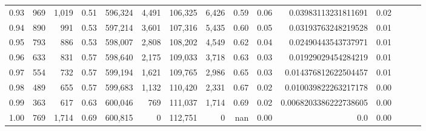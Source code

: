 \begin{tabular}{rrrrrrrrrrrrrrr}
0.93 &     969 &  1,019 &  0.51 &  596,324 &    4,491 &  106,325 &    6,426 &  0.59 &  0.06 &    0.03983113231811691 &      0.02 \\
0.94 &     890 &    991 &  0.53 &  597,214 &    3,601 &  107,316 &    5,435 &  0.60 &  0.05 &    0.03193763248219528 &      0.01 \\
0.95 &     793 &    886 &  0.53 &  598,007 &    2,808 &  108,202 &    4,549 &  0.62 &  0.04 &    0.02490443543737971 &      0.01 \\
0.96 &     633 &    831 &  0.57 &  598,640 &    2,175 &  109,033 &    3,718 &  0.63 &  0.03 &    0.01929029454284219 &      0.01 \\
0.97 &     554 &    732 &  0.57 &  599,194 &    1,621 &  109,765 &    2,986 &  0.65 &  0.03 &   0.014376812622504457 &      0.01 \\
0.98 &     489 &    655 &  0.57 &  599,683 &    1,132 &  110,420 &    2,331 &  0.67 &  0.02 &   0.010039822263217178 &      0.00 \\
0.99 &     363 &    617 &  0.63 &  600,046 &      769 &  111,037 &    1,714 &  0.69 &  0.02 &  0.0068203386222738605 &      0.00 \\
1.00 &     769 &  1,714 &  0.69 &  600,815 &        0 &  112,751 &        0 &   nan &  0.00 &                    0.0 &      0.00 \\
\bottomrule
\end{tabular}
